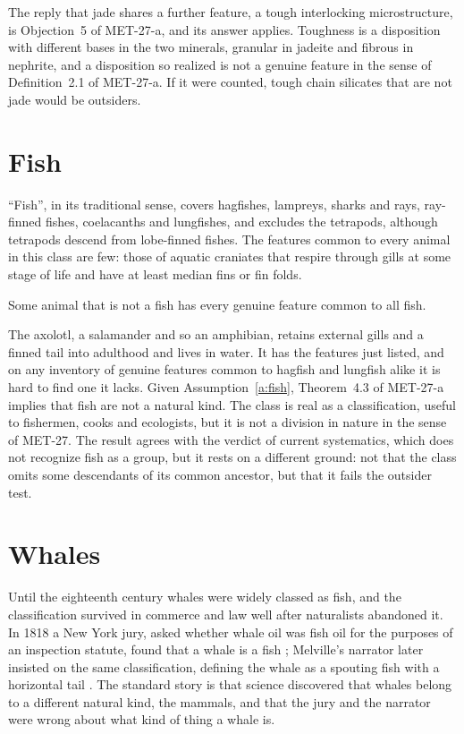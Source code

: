 \documentclass{situationist-preprint}
\begin{document}
The reply that jade shares a further feature, a tough interlocking microstructure, is Objection~5 of MET-27-a, and its answer applies. Toughness is a disposition with different bases in the two minerals, granular in jadeite and fibrous in nephrite, and a disposition so realized is not a genuine feature in the sense of Definition~2.1 of MET-27-a. If it were counted, tough chain silicates that are not jade would be outsiders.

\section{Fish}

\enquote{Fish}, in its traditional sense, covers hagfishes, lampreys, sharks and rays, ray-finned fishes, coelacanths and lungfishes, and excludes the tetrapods, although tetrapods descend from lobe-finned fishes. The features common to every animal in this class are few: those of aquatic craniates that respire through gills at some stage of life and have at least median fins or fin folds.

\begin{assumption}[Fish]\label{a:fish}
Some animal that is not a fish has every genuine feature common to all fish.
\end{assumption}

The axolotl, a salamander and so an amphibian, retains external gills and a finned tail into adulthood and lives in water. It has the features just listed, and on any inventory of genuine features common to hagfish and lungfish alike it is hard to find one it lacks. Given Assumption~\ref{a:fish}, Theorem~4.3 of MET-27-a implies that fish are not a natural kind. The class is real as a classification, useful to fishermen, cooks and ecologists, but it is not a division in nature in the sense of MET-27. The result agrees with the verdict of current systematics, which does not recognize fish as a group, but it rests on a different ground: not that the class omits some descendants of its common ancestor, but that it fails the outsider test.

\section{Whales}

Until the eighteenth century whales were widely classed as fish, and the classification survived in commerce and law well after naturalists abandoned it. In 1818 a New York jury, asked whether whale oil was fish oil for the purposes of an inspection statute, found that a whale is a fish \citep{Burnett2007}; Melville's narrator later insisted on the same classification, defining the whale as a spouting fish with a horizontal tail \citep[ch.~32]{Melville1851}. The standard story is that science discovered that whales belong to a different natural kind, the mammals, and that the jury and the narrator were wrong about what kind of thing a whale is.
\end{document}
